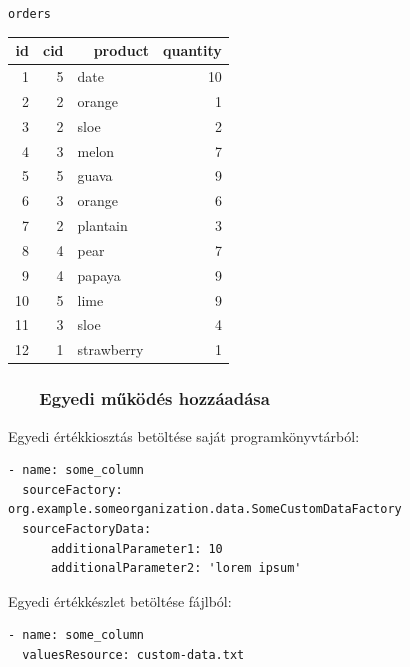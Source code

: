 \documentclass[
]{beamer}
\newcommand{\slidetitle}[2]{\frametitle{{\small #1 ~ \ding{226} ~ } \normalsize \textbf{#2} }}
\begin{document}
\begin{frame}
\begin{minipage}[c]{0.45\textwidth}
        \vspace{0.5cm}
        
        \normalsize \texttt{orders}
        \vspace{0.1cm}
        
        \tiny
        \begin{tabular}{ |r|r|l|r| }
        \hline
            id & cid & ~~product & quantity \\
        \hline
            1 & 5 & date & 10 \\
            2 & 2 & orange & 1 \\
            3 & 2 & sloe & 2 \\
            4 & 3 & melon & 7 \\
            5 & 5 & guava & 9 \\
            6 & 3 & orange & 6 \\
            7 & 2 & plantain & 3 \\
            8 & 4 & pear & 7 \\
            9 & 4 & papaya & 9 \\
            10 & 5 & lime & 9 \\
            11 & 3 & sloe & 4 \\
            12 & 1 & strawberry & 1 \\
        \hline
        \end{tabular}
    \end{minipage}
\end{frame}

\begin{frame}[containsverbatim]
    \slidetitle{\sectionshorttitle}{Egyedi működés hozzáadása}
    
    Egyedi értékkiosztás betöltése saját programkönyvtárból:
    
    \begin{verbatim}
- name: some_column
  sourceFactory: org.example.someorganization.data.SomeCustomDataFactory
  sourceFactoryData:
      additionalParameter1: 10
      additionalParameter2: 'lorem ipsum'
    \end{verbatim}
    
    \vspace{0.5em}
    
    Egyedi értékkészlet betöltése fájlból:
    
    \begin{verbatim}
- name: some_column
  valuesResource: custom-data.txt
    \end{verbatim}
    
\end{frame}
\end{document}
